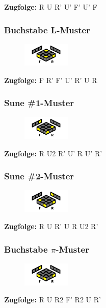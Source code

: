 \documentclass[letterpaper,10pt,twoside,twocolumn,openany]{book}
\begin{document}
\centering \textbf{Zugfolge:} R U R' U' F' U' F

\subsubsection{Buchstabe L-Muster}
\begin{figure}[!htb] 
  \centering
     \includegraphics[width=0.20\textwidth]{img/l_pattern.png}
\end{figure}
\centering \textbf{Zugfolge:} F R' F' U' R' U R

\subsubsection{Sune \#1-Muster}
\begin{figure}[!htb] 
  \centering
     \includegraphics[width=0.20\textwidth]{img/sune_pattern_1.png}
\end{figure}
\centering \textbf{Zugfolge:} R U2 R' U' R U' R'
\newpage

\subsubsection{Sune \#2-Muster}
\begin{figure}[!htb] 
  \centering
     \includegraphics[width=0.20\textwidth]{img/sune_pattern_2.png}
\end{figure}
\centering \textbf{Zugfolge:} R U R' U R U2 R'

\subsubsection{Buchstabe $\pi$-Muster}
\begin{figure}[!htb] 
  \centering
     \includegraphics[width=0.20\textwidth]{img/pi_pattern.png}
\end{figure}
\centering \textbf{Zugfolge:} R U R2 F' R2 U R'
\end{document}
